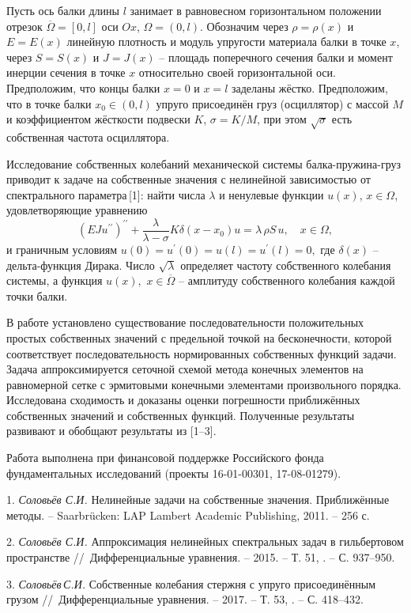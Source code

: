 




\vzmscaption


Пусть ось балки длины $l$
занимает в равновесном горизонтальном положении отрезок $\overline{\Omega}=[0,l]$
оси $Ox$, $\Omega=(0,l)$. Обозначим через $\rho=\rho(x)$ и $E=E(x)$ линейную плотность и
модуль упругости материала балки в точке $x$,
через $S=S(x)$ и $J=J(x)$ -- площадь поперечного сечения балки и момент
инерции сечения в точке $x$ относительно своей горизонтальной оси.
Предположим, что концы балки $x=0$ и $x=l$ заделаны жёстко.
Предположим,
что в точке балки
$x_0\in(0,l)$ упруго присоединён груз (осциллятор) с массой $M$  и
коэффициентом жёсткости подвески $K$,
$\sigma=K/M$,
при этом
$\sqrt{\sigma}$ есть собственная частота осциллятора.

Исследование собственных колебаний механической системы балка-пружина-груз приводит к
задаче на собственные значения с нелинейной зависимостью от спектрального параметра\,[1]:
найти числа $\lambda$ и ненулевые функции $u(x)$, $x\in\Omega$,
удовлетворяющие уравнению
$$
(EJu^{\prime\prime})^{\prime\prime}+
\frac{\lambda}{\lambda-\sigma}
K\delta(x-x_0)u=
\lambda\,\rho S\,u,\quad
x\in\Omega,
$$
и граничным условиям
$
u(0)=u^{\prime}(0)=u(l)=u^{\prime}(l)=0,
$
где $\delta(x)$ -- дельта-функция Дирака.
Число $\sqrt{\lambda}$ определяет частоту собственного колебания системы, а функция
$u(x),$ $x\in\overline{\Omega}$ -- амплитуду собственного колебания каждой точки балки.

В работе установлено существование последовательности положительных
простых собственных значений с предельной точкой
на бесконечности, которой соответствует последовательность нормированных собственных функций задачи.
Задача аппроксимируется сеточной схемой метода конечных
элементов на равномерной сетке с эрмитовыми конечными элементами произвольного порядка.
Исследована сходимость и доказаны оценки погрешности приближённых
собственных значений и собственных функций.
Полученные результаты развивают и обобщают результаты из [1--3].

Работа выполнена при финансовой поддержке Российского фонда фундаментальных исследований
(проекты 16-01-00301, 17-08-01279).


\litlist

1. {\it Соловьёв С.И.}
Нелинейные задачи на собственные значения. Приближённые методы. --
Saarbr\"ucken: LAP Lambert Academic Publishing, 2011. -- 256 с.

2. {\it Соловьёв С.И.}
Аппроксимация нелинейных спектральных задач в гильбертовом пространстве
//~Дифференциальные уравнения. -- 2015. -- Т. 51,
. -- С. 937--950.

3. {\it Соловьёв\,С.И.}
Собственные колебания стержня с упруго присоединённым грузом
//~Дифференциальные уравнения. -- 2017. -- Т. 53,
. -- С. 418--432.

